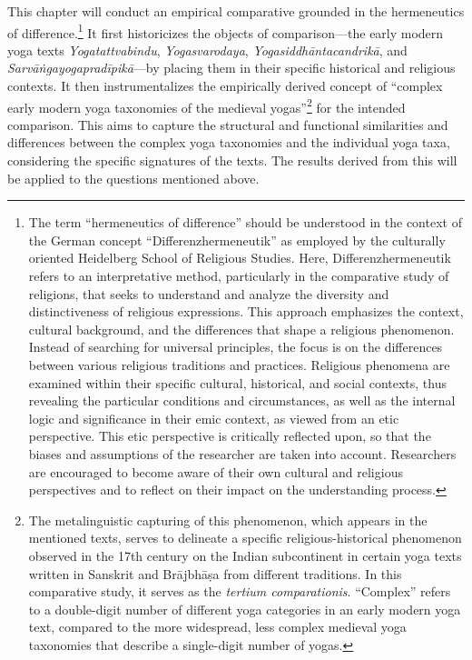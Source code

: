 This chapter will conduct an empirical comparative grounded in the hermeneutics of difference.\footnote{The term ``hermeneutics of difference'' should be understood in the context of the German concept ``Differenzhermeneutik'' as employed by the culturally oriented Heidelberg School of Religious Studies. Here, Differenzhermeneutik refers to an interpretative method, particularly in the comparative study of religions, that seeks to understand and analyze the diversity and distinctiveness of religious expressions. This approach emphasizes the context, cultural background, and the differences that shape a religious phenomenon. Instead of searching for universal principles, the focus is on the differences between various religious traditions and practices. Religious phenomena are examined within their specific cultural, historical, and social contexts, thus revealing the particular conditions and circumstances, as well as the internal logic and significance in their emic context, as viewed from an etic perspective. This etic perspective is critically reflected upon, so that the biases and assumptions of the researcher are taken into account. Researchers are encouraged to become aware of their own cultural and religious perspectives and to reflect on their impact on the understanding process.} It first historicizes the objects of comparison—the early modern yoga texts \emph{Yogatattvabindu}, \emph{Yogasvarodaya}, \emph{Yogasiddhāntacandrikā}, and \emph{Sarvāṅgayogapradīpikā}—by placing them in their specific historical and religious contexts. It then instrumentalizes the empirically derived concept of ``complex early modern yoga taxonomies of the medieval yogas''\footnote{The metalinguistic capturing of this phenomenon, which appears in the mentioned texts, serves to delineate a specific religious-historical phenomenon observed in the 17th century on the Indian subcontinent in certain yoga texts written in Sanskrit and Brājbhāṣa from different traditions. In this comparative study, it serves as the \textit{tertium comparationis}. ``Complex'' refers to a double-digit number of different yoga categories in an early modern yoga text, compared to the more widespread, less complex medieval yoga taxonomies that describe a single-digit number of yogas.} for the intended comparison. This aims to capture the structural and functional similarities and differences between the complex yoga taxonomies and the individual yoga taxa, considering the specific signatures of the texts. The results derived from this will be applied to the questions mentioned above.

